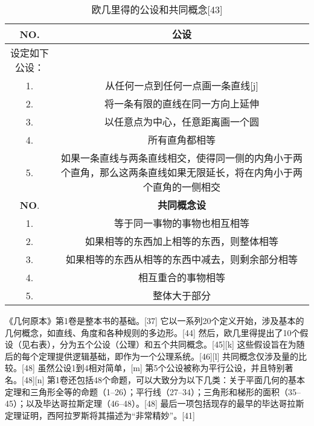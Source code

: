 \begin{table}[ht]
\centering
\caption{欧几里得的公设和共同概念[43]}\label{Euclid}
\begin{tabular}{|c|c}
\hline \textbf{NO}.& \textbf{公设}\\
\hline 设定如下公设：& \\
\hline 1. & 从任何一点到任何一点画一条直线[j]\\ 
\hline 2. & 将一条有限的直线在同一方向上延伸 \\ 
\hline 3. & 以任意点为中心，任意距离画一个圆 \\ 
\hline 4. & 所有直角都相等\\  
\hline 5. & 如果一条直线与两条直线相交，使得同一侧的内角小于两个直角，那么这两条直线如果无限延长，将在内角小于两个直角的一侧相交\\
\hline \textbf{NO}.& \textbf{共同概念设}\\
\hline 1. & 等于同一事物的事物也相互相等\\  
\hline 2. & 如果相等的东西加上相等的东西，则整体相等\\  
\hline 3. & 如果相等的东西从相等的东西中减去，则剩余部分相等\\  
\hline 4. & 相互重合的事物相等\\  
\hline 5. & 整体大于部分\\
\hline 
\end{tabular}
\end{table}
《几何原本》第1卷是整本书的基础。[37] 它以一系列20个定义开始，涉及基本的几何概念，如直线、角度和各种规则的多边形。[44] 然后，欧几里得提出了10个假设（见右表），分为五个公设（公理）和五个共同概念。[45][k] 这些假设旨在为随后的每个定理提供逻辑基础，即作为一个公理系统。[46][l] 共同概念仅涉及量的比较。[48] 虽然公设1到4相对简单，[m] 第5个公设被称为平行公设，并且特别著名。[48][n] 第1卷还包括48个命题，可以大致分为以下几类：关于平面几何的基本定理和三角形全等的命题（1–26）；平行线（27–34）；三角形和梯形的面积（35–45）；以及毕达哥拉斯定理（46–48）。[48] 最后一项包括现存的最早的毕达哥拉斯定理证明，西阿拉罗斯将其描述为“非常精妙”。[41]



  


 
